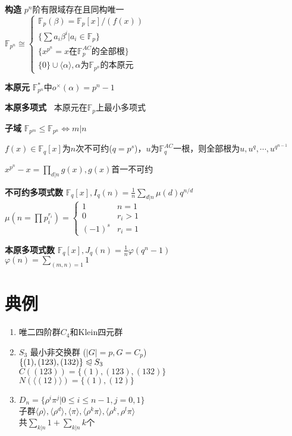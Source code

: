 \documentclass[b4paper, 10pt]{ctexart}
\newcommand*{\bb}[1]{\mathbb{#1}}
\renewcommand*{\iff}{\Leftrightarrow}
\renewcommand*{\leq}{\leqslant}
\newcommand*{\nmsubgroupeq}{\trianglelefteqslant}
\newcommand*{\gengroup}[1]{\langle #1 \rangle}
\newcommand*{\genfield}[1]{\langle #1 \rangle}
\newcommand*{\ff}[1]{\bb{F}_{#1}}
\begin{document}
\begin{multicols}{3}
    \textbf{构造} $p^n$阶有限域存在且同构唯一\\
    $\ff{p^n} \cong \begin{cases}
            \ff{p}(\beta) = \ff{p}[x]/(f(x))          \\
            \{\sum a_i \beta^i | a_i \in \ff{p}\}     \\
            \{x^{p^n} = x \text{在$\ff{p}^{AC}$的全部根}\} \\
            \{0\} \cup \genfield{\alpha}, \alpha\text{为$\ff{p^n}$的本原元}
        \end{cases}$

    \textbf{本原元} $\ff{p^n}^*$中$o^\times(\alpha) = p^n - 1$

    \textbf{本原多项式\ } 本原元在$\ff{p}$上最小多项式

    \textbf{子域} $\ff{p^m} \leq \ff{p^n} \iff m | n$

    \begin{theorem}[多项式根]
        $f(x) \in \ff{q}[x]$为$n$次不可约($q=p^s$)，$u$为$\ff{q}^{AC}$一根，则全部根为$u, u^q,\cdots,u^{q^{n-1}}$
    \end{theorem}

    \begin{theorem}[一篮子分解]
        $x^{p^n} \! - \! x \! = \! \prod\limits_{d|n} g(x), g(x)$首一不可约
    \end{theorem}

    \textbf{不可约多项式数} $\ff{q}[x], I_q(n) = \frac{1}{n} \sum\limits_{d|n} \mu(d) q^{n/d}$ \\
    $\mu(n = \prod p_i^{r_i}) = \begin{cases}
            1      & n = 1   \\
            0      & r_i > 1 \\
            (-1)^s & r_i = 1
        \end{cases}$

    \textbf{本原多项式数} $\ff{q}[x], J_q(n) = \frac{1}{n} \varphi(q^n - 1)$ \\
    $\varphi(n) = \sum\limits_{(m, n) = 1} 1$

    \section{典例}

    \begin{enumerate}
        \item 唯二四阶群$C_4$和Klein四元群
        \item $S_3$ 最小非交换群 ($|G| = p, G = C_p$)\\
              $\{(1), (123), (132)\} \nmsubgroupeq S_3$ \\
              $C((123)) = \{ (1), (123), (132) \}$ \\
              $N(\gengroup{(12)}) = \{ (1), (12) \}$
        \item $D_n = \{\rho^i \pi^j | 0 \leq i \leq n - 1, j = 0, 1 \}$ \\
              子群$\gengroup{\rho}, \gengroup{\rho^d}, \gengroup{\pi}, \gengroup{\rho^k \pi}, \gengroup{\rho^k, \rho^l\pi}$ \\
              共$\sum_{k|n} 1 + \sum_{k|n} k$个


\end{enumerate}
\end{multicols}
\end{document}
